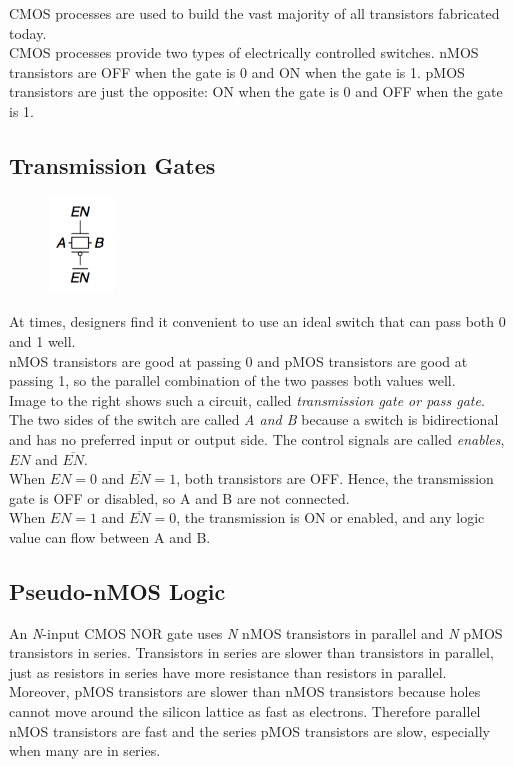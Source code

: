 \documentclass[12pt]{article}
\theoremstyle{definition}
\begin{document}
  CMOS processes are used to build the vast majority of all transistors fabricated today. \\
  CMOS processes provide two types of electrically controlled switches.
  nMOS transistors are OFF when the gate is 0 and ON when the gate is 1.
  pMOS transistors are just the opposite: ON when the gate is 0 and OFF when the gate is 1.

  \subsection{Transmission Gates}
  \begin{figure}
    \centering
    \includegraphics[width=0.15\textwidth]{pictures/transmissionGate.png}
  \end{figure}
  At times, designers find it convenient to use an ideal switch that can pass both 0 and 1 well. \\
  nMOS transistors are good at passing 0 and pMOS transistors are good at passing 1, so the parallel combination of the two passes both values well. \\
  Image to the right shows such a circuit, called \emph{transmission gate \emph{or} pass gate}. \\
  The two sides of the switch are called \emph{A \emph{and} B} because a switch is bidirectional and has no preferred input or output side.
  The control signals are called \emph{enables}, $EN$ and $\overline{EN}$. \\
  When $EN = 0$ and $\overline{EN} = 1$, both transistors are OFF.
  Hence, the transmission gate is OFF or disabled, so A and B are not connected. \\
  When $EN = 1$ and $\overline{EN} = 0$, the transmission is ON or enabled, and any logic value can flow between A and B.

  \subsection{Pseudo-nMOS Logic}
  An \emph{N}-input CMOS NOR gate uses \emph{N} nMOS transistors in parallel and \emph{N} pMOS transistors in series.
  Transistors in series are slower than transistors in parallel, just as resistors in series have more resistance than resistors in parallel. \\
  Moreover, pMOS transistors are slower than nMOS transistors because holes cannot move around the silicon lattice as fast as electrons.
  Therefore parallel nMOS transistors are fast and the series pMOS transistors are slow, especially when many are in series. \\
\end{document}
